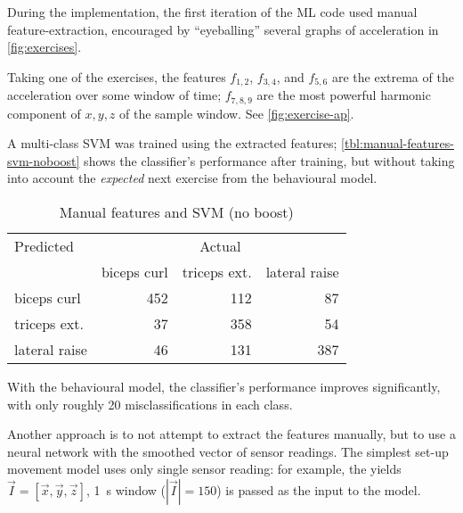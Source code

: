 During the implementation, the first iteration of the ML code used manual feature-extraction, encouraged by ``eyeballing'' several graphs of acceleration in \autoref{fig:exercises}.


Taking one of the exercises, the features $f_{1,2}$, $f_{3,4}$, and $f_{5,6}$ are the extrema of the acceleration over some window of time; $f_{7,8,9}$ are the most powerful harmonic component of $x, y, z$ of the sample window. See \autoref{fig:exercise-ap}.


A multi-class SVM was trained using the extracted features; \autoref{tbl:manual-features-svm-noboost} shows the classifier's performance after training, but without taking into account the \emph{expected} next exercise from the behavioural model.

\begin{table}[h]
    \begin{tabular}{lrrr}
        \toprule
        Predicted         & \multicolumn{3}{c}{Actual} \\
        \cmidrule(r){2-4} & biceps curl & triceps ext. & lateral raise \\
        \midrule
        biceps curl       & 452         & 112          & 87 \\ 
        triceps ext.      & 37          & 358          & 54 \\
        lateral raise     & 46          & 131          & 387 \\
        \bottomrule
    \end{tabular}
    \caption{Manual features and SVM (no boost)}
    \label{tbl:manual-features-svm-noboost}
\end{table}

With the behavioural model, the classifier's performance improves significantly, with only roughly 20 misclassifications in each class. 

Another approach is to not attempt to extract the features manually, but to use a neural network with the smoothed vector of sensor readings. The simplest set-up movement model uses only single sensor reading: for example, the  yields $\vec{I} = [\vec{x}, \vec{y}, \vec{z}]$, \SI{1}{\second} window ($|\vec{I}| = 150$) is passed as the input to the model.

